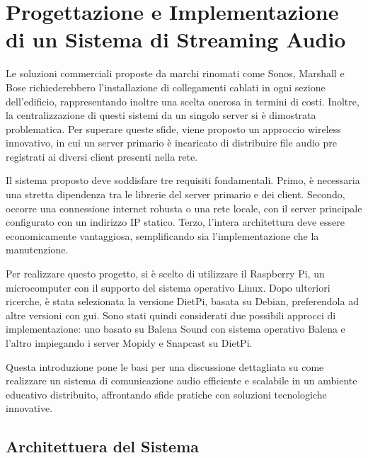 
%

\chapter{Progettazione e Implementazione di un Sistema di Streaming Audio}
\label{cha:streamingaudio}


Le soluzioni commerciali proposte da marchi rinomati come Sonos, Marshall e Bose richiederebbero l'installazione di collegamenti cablati in ogni sezione dell'edificio, rappresentando inoltre una scelta onerosa in termini di costi. Inoltre, la centralizzazione di questi sistemi da un singolo server si è dimostrata problematica. Per superare queste sfide, viene proposto un approccio wireless innovativo, in cui un server primario è incaricato di distribuire file audio pre registrati ai diversi client presenti nella rete.

Il sistema proposto deve soddisfare tre requisiti fondamentali. Primo, è necessaria una stretta dipendenza tra le librerie del server primario e dei client. Secondo, occorre una connessione internet robusta o una rete locale, con il server principale configurato con un indirizzo IP statico. Terzo, l'intera architettura deve essere economicamente vantaggiosa, semplificando sia l'implementazione che la manutenzione.

Per realizzare questo progetto, si è scelto di utilizzare il Raspberry Pi, un microcomputer con il supporto del sistema operativo Linux. Dopo ulteriori ricerche, è stata selezionata la versione DietPi, basata su Debian, preferendola ad altre versioni con \gls{gui}. Sono stati quindi considerati due possibili approcci di implementazione: uno basato su Balena Sound con sistema operativo Balena e l'altro impiegando i server Mopidy e Snapcast su DietPi.

Questa introduzione pone le basi per una discussione dettagliata su come realizzare un sistema di comunicazione audio efficiente e scalabile in un ambiente educativo distribuito, affrontando sfide pratiche con soluzioni tecnologiche innovative.

\section{Architettuera del Sistema}
\noindent

